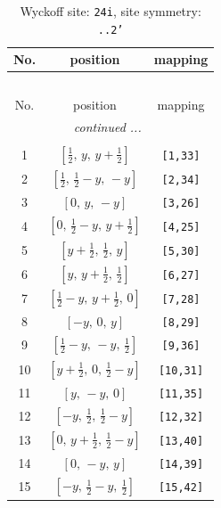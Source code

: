 \documentclass[fleqn,8pt]{jsarticle}
\begin{document}
\begin{longtable}{ccc}
\caption{Wyckoff site: {\tt 24i}, site symmetry: {\tt ..2'}}
 \\
 \hline \hline
No. & position & mapping \\ \hline \endfirsthead

\multicolumn{2}{l}{\tablename\ \thetable{}} \\
 \hline \hline
No. & position & mapping \\ \hline \endhead

 \hline \hline
\multicolumn{2}{r}{\footnotesize\it continued ...} \\ \endfoot

 \hline \hline
\multicolumn{2}{r}{} \\ \endlastfoot

1 & $\left[ \frac{1}{2},\, y,\, y + \frac{1}{2} \right]$ & {\tt [1,33]} \\ \hline
2 & $\left[ \frac{1}{2},\, \frac{1}{2} - y,\, - y \right]$ & {\tt [2,34]} \\ \hline
3 & $\left[ 0,\, y,\, - y \right]$ & {\tt [3,26]} \\ \hline
4 & $\left[ 0,\, \frac{1}{2} - y,\, y + \frac{1}{2} \right]$ & {\tt [4,25]} \\ \hline
5 & $\left[ y + \frac{1}{2},\, \frac{1}{2},\, y \right]$ & {\tt [5,30]} \\ \hline
6 & $\left[ y,\, y + \frac{1}{2},\, \frac{1}{2} \right]$ & {\tt [6,27]} \\ \hline
7 & $\left[ \frac{1}{2} - y,\, y + \frac{1}{2},\, 0 \right]$ & {\tt [7,28]} \\ \hline
8 & $\left[ - y,\, 0,\, y \right]$ & {\tt [8,29]} \\ \hline
9 & $\left[ \frac{1}{2} - y,\, - y,\, \frac{1}{2} \right]$ & {\tt [9,36]} \\ \hline
10 & $\left[ y + \frac{1}{2},\, 0,\, \frac{1}{2} - y \right]$ & {\tt [10,31]} \\ \hline
11 & $\left[ y,\, - y,\, 0 \right]$ & {\tt [11,35]} \\ \hline
12 & $\left[ - y,\, \frac{1}{2},\, \frac{1}{2} - y \right]$ & {\tt [12,32]} \\ \hline
13 & $\left[ 0,\, y + \frac{1}{2},\, \frac{1}{2} - y \right]$ & {\tt [13,40]} \\ \hline
14 & $\left[ 0,\, - y,\, y \right]$ & {\tt [14,39]} \\ \hline
15 & $\left[ - y,\, \frac{1}{2} - y,\, \frac{1}{2} \right]$ & {\tt [15,42]} \\ \hline

\end{longtable}
\end{document}
